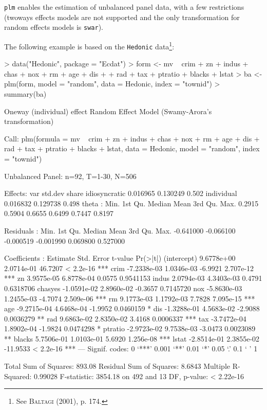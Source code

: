 \documentclass[a4paper]{article}
\begin{document}
\texttt{plm} enables the estimation of unbalanced panel data, with a
few restrictions (twoways effects models are not supported and the
only transformation for random effects models is \texttt{swar}).

The
following example is based on the \texttt{Hedonic} data\footnote{See \textsc{Baltagi}
  (2001), p. 174.}:

\begin{Schunk}
\begin{Sinput}
> data("Hedonic", package = "Ecdat")
> form <- mv ~ crim + zn + indus + chas + nox + rm + age + dis + 
+     rad + tax + ptratio + blacks + lstat
> ba <- plm(form, model = "random", data = Hedonic, index = "townid")
> summary(ba)
\end{Sinput}
\begin{Soutput}
Oneway (individual) effect Random Effect Model (Swamy-Arora's transformation)

Call:
plm(formula = mv ~ crim + zn + indus + chas + nox + rm + age + 
    dis + rad + tax + ptratio + blacks + lstat, data = Hedonic, 
    model = "random", index = "townid")

Unbalanced Panel: n=92, T=1-30, N=506

Effects:
                   var  std.dev share
idiosyncratic 0.016965 0.130249 0.502
individual    0.016832 0.129738 0.498
theta  : 
   Min. 1st Qu.  Median    Mean 3rd Qu.    Max. 
 0.2915  0.5904  0.6655  0.6499  0.7447  0.8197 

Residuals :
     Min.   1st Qu.    Median      Mean   3rd Qu.      Max. 
-0.641000 -0.066100 -0.000519 -0.001990  0.069800  0.527000 

Coefficients :
               Estimate  Std. Error  t-value  Pr(>|t|)    
(intercept)  9.6778e+00  2.0714e-01  46.7207 < 2.2e-16 ***
crim        -7.2338e-03  1.0346e-03  -6.9921 2.707e-12 ***
zn           3.9575e-05  6.8778e-04   0.0575 0.9541153    
indus        2.0794e-03  4.3403e-03   0.4791 0.6318706    
chasyes     -1.0591e-02  2.8960e-02  -0.3657 0.7145720    
nox         -5.8630e-03  1.2455e-03  -4.7074 2.509e-06 ***
rm           9.1773e-03  1.1792e-03   7.7828 7.095e-15 ***
age         -9.2715e-04  4.6468e-04  -1.9952 0.0460159 *  
dis         -1.3288e-01  4.5683e-02  -2.9088 0.0036279 ** 
rad          9.6863e-02  2.8350e-02   3.4168 0.0006337 ***
tax         -3.7472e-04  1.8902e-04  -1.9824 0.0474298 *  
ptratio     -2.9723e-02  9.7538e-03  -3.0473 0.0023089 ** 
blacks       5.7506e-01  1.0103e-01   5.6920 1.256e-08 ***
lstat       -2.8514e-01  2.3855e-02 -11.9533 < 2.2e-16 ***
---
Signif. codes:  0 ‘***’ 0.001 ‘**’ 0.01 ‘*’ 0.05 ‘.’ 0.1 ‘ ’ 1 

Total Sum of Squares: 893.08
Residual Sum of Squares: 8.6843
Multiple R-Squared: 0.99028
F-statistic: 3854.18 on 492 and 13 DF, p-value: < 2.22e-16
\end{Soutput}
\end{Schunk}
\end{document}
